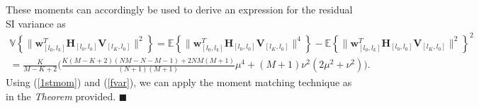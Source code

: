 \documentclass[onecolumn]{IEEEtran}
\begin{document}
These moments can accordingly be used to derive an expression for the residual SI variance as\begin{multline}
\mathbb{V} \left\{ \| \boldsymbol{w}^{T}_{[l_{0},l_{k}]} \boldsymbol{H}_{[l_{0},l_{0}]} \boldsymbol{V}_{[l_{K},l_{0}]}  \|^2 \right\} = \mathbb{E} \left\{ \| \boldsymbol{w}^{T}_{[l_{0},l_{k}]} \boldsymbol{H}_{[l_{0},l_{0}]} \boldsymbol{V}_{[l_{K},l_{0}]}  \|^4 \right\} - \mathbb{E} \left\{ \| \boldsymbol{w}^{T}_{[l_{0},l_{k}]} \boldsymbol{H}_{[l_{0},l_{0}]} \boldsymbol{V}_{[l_{K},l_{0}]}  \|^{2} \right\}^{2} \\ = \tfrac{K}{M-K+2} \Biggr(\tfrac{K \left( M - K + 2 \right) ( N M - N - M - 1) + 2 N M (M+1)}{(N + 1) (M + 1)} \mu^4 + (M+1) \nu^2 \left( 2 \mu^2 + \nu^2 \right) \Biggr).
\label{fvar}
\end{multline}
Using (\ref{1stmom}) and (\ref{fvar}), we can apply the moment matching technique as in the \textit{Theorem} provided.
\hfill $\blacksquare$
\end{document}
